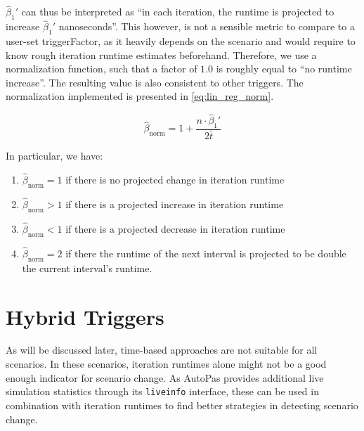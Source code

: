 $\hat\beta_1'$ can thus be interpreted as \enquote{in each iteration, the runtime is projected to increase $\hat\beta_1'$ nanoseconds}. This however, is not a sensible metric to compare to a user-set triggerFactor, as it heavily depends on the scenario and would require to know rough iteration runtime estimates beforehand. Therefore, we use a normalization function, such that a factor of $1.0$ is roughly equal to \enquote{no runtime increase}. The resulting value is also consistent to other triggers. The normalization implemented is presented in \eqref{eq:lin_reg_norm}.


\begin{equation}
	\hat\beta_{\text{norm}} = 1+\frac{n\cdot\hat\beta_1'}{2\bar t}\label{eq:lin_reg_norm}
\end{equation}

In particular, we have:

\begin{enumerate}[label=(\roman*)]
	\item $\hat\beta_{\text{norm}} = 1$ if there is no projected change in iteration runtime
	\item $\hat\beta_{\text{norm}} > 1$ if there is a projected increase in iteration runtime
	\item $\hat\beta_{\text{norm}} < 1$ if there is a projected decrease in iteration runtime
	\item $\hat\beta_{\text{norm}} = 2$ if there the runtime of the next interval is projected to be double the current interval's runtime.
\end{enumerate}

\section{Hybrid Triggers}
As will be discussed later, time-based approaches are not suitable for all scenarios. In these scenarios, iteration runtimes alone might not be a good enough indicator for scenario change. As AutoPas provides additional live simulation statistics through its \texttt{liveinfo} interface, these can be used in combination with iteration runtimes to find better strategies in detecting scenario change.


